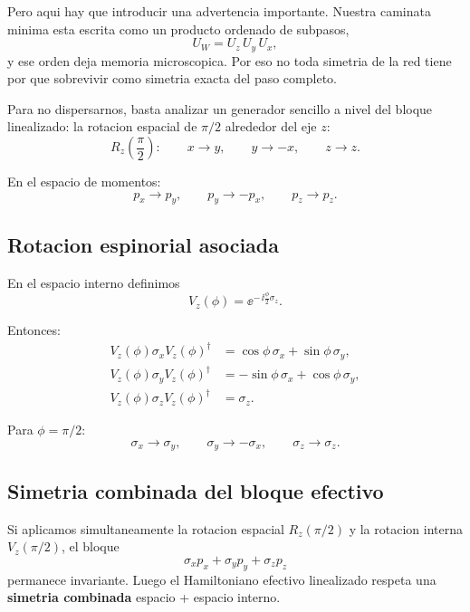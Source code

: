 Pero aqui hay que introducir una advertencia importante. Nuestra caminata minima esta escrita como un producto ordenado de subpasos,
\begin{equation}
U_W = U_z\,U_y\,U_x,
\end{equation}
y ese orden deja memoria microscopica. Por eso no toda simetria de la red tiene por que sobrevivir como simetria exacta del paso completo.

Para no dispersarnos, basta analizar un generador sencillo a nivel del bloque linealizado: la rotacion espacial de \(\pi/2\) alrededor del eje \(z\):
\begin{equation}
R_z\left(\frac{\pi}{2}\right):
\qquad
x\to y,
\qquad
y\to -x,
\qquad
z\to z.
\label{c09:eq:Rz}
\end{equation}

En el espacio de momentos:
\begin{equation}
p_x \to p_y,
\qquad
p_y \to -p_x,
\qquad
p_z \to p_z.
\label{c09:eq:Rzmom}
\end{equation}

\subsection{Rotacion espinorial asociada}
En el espacio interno definimos
\begin{equation}
V_z(\phi)=\ee^{-\,\ii \frac{\phi}{2}\sigma_z}.
\label{c09:eq:Vz}
\end{equation}

Entonces:
\begin{align}
V_z(\phi)\sigma_x V_z(\phi)^\dagger &= \cos\phi\,\sigma_x + \sin\phi\,\sigma_y,\\
V_z(\phi)\sigma_y V_z(\phi)^\dagger &= -\sin\phi\,\sigma_x + \cos\phi\,\sigma_y,\\
V_z(\phi)\sigma_z V_z(\phi)^\dagger &= \sigma_z.
\end{align}

Para \(\phi=\pi/2\):
\begin{equation}
\sigma_x \to \sigma_y,
\qquad
\sigma_y \to -\sigma_x,
\qquad
\sigma_z \to \sigma_z.
\label{c09:eq:spinrot}
\end{equation}

\subsection{Simetria combinada del bloque efectivo}
Si aplicamos simultaneamente la rotacion espacial \(R_z(\pi/2)\) y la rotacion interna \(V_z(\pi/2)\), el bloque
\begin{equation}
\sigma_x p_x + \sigma_y p_y + \sigma_z p_z
\end{equation}
permanece invariante. Luego el Hamiltoniano efectivo linealizado respeta una \textbf{simetria combinada} espacio + espacio interno.


